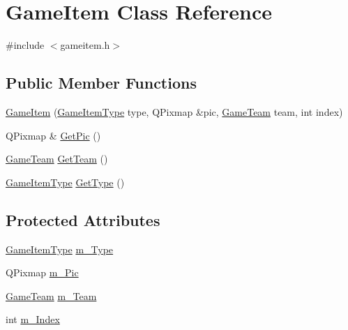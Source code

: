 \hypertarget{class_game_item}{
\section{GameItem Class Reference}
\label{class_game_item}
}


{\ttfamily \#include $<$gameitem.h$>$}

\subsection*{Public Member Functions}
\begin{DoxyCompactItemize}
\item 
\hyperlink{class_game_item_afdbe7654a52ca3fc6fc5811f63c4900f}{GameItem} (\hyperlink{gameitem_8h_abc058497c165776ebe58f8e8e62d0b14}{GameItemType} type, QPixmap \&pic, \hyperlink{gameitem_8h_a07e62b9e90f710bd2104bf6494d20c03}{GameTeam} team, int index)
\item 
QPixmap \& \hyperlink{class_game_item_a9bdbe031562f8929d93fd99f7fb48ede}{GetPic} ()
\item 
\hyperlink{gameitem_8h_a07e62b9e90f710bd2104bf6494d20c03}{GameTeam} \hyperlink{class_game_item_aa13a5028b52e8a05ba30872df21245ef}{GetTeam} ()
\item 
\hyperlink{gameitem_8h_abc058497c165776ebe58f8e8e62d0b14}{GameItemType} \hyperlink{class_game_item_aace7965072746e93d88f8d182c387b54}{GetType} ()
\end{DoxyCompactItemize}
\subsection*{Protected Attributes}
\begin{DoxyCompactItemize}
\item 
\hyperlink{gameitem_8h_abc058497c165776ebe58f8e8e62d0b14}{GameItemType} \hyperlink{class_game_item_a8c4bb763f9d85c07e2e27a06f0b68c16}{m\_\-Type}
\item 
QPixmap \hyperlink{class_game_item_a05d69a5d9238ae99b66935960071c79a}{m\_\-Pic}
\item 
\hyperlink{gameitem_8h_a07e62b9e90f710bd2104bf6494d20c03}{GameTeam} \hyperlink{class_game_item_a874e91b85de1de343cf641b6c7ac9bc3}{m\_\-Team}
\item 
int \hyperlink{class_game_item_a7fbc373a40381451ce97b8ca485a7e1c}{m\_\-Index}
\end{DoxyCompactItemize}


